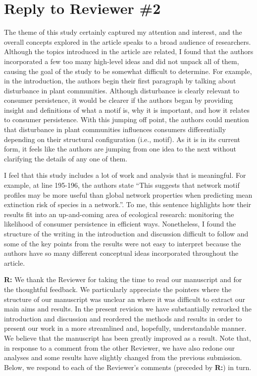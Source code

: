 \documentclass[12pt]{article}
\newenvironment{refquote}{\bigskip \begin{it}}{\end{it}\medskip}
\begin{document}
\clearpage

\section*{Reply to Reviewer \#2}

    \begin{refquote}

        The theme of this study certainly captured my attention and interest, and the overall concepts explored in the article speaks to a broad audience of researchers. Although the topics introduced in the article are related, I found that the authors incorporated a few too many high-level ideas
        and did not unpack all of them, causing the goal of the study to be somewhat difficult to determine. For example, in the introduction, the authors begin their first paragraph by talking about disturbance in plant communities. Although disturbance is clearly relevant to consumer persistence, it would be clearer if the authors began by providing insight and definitions of what a motif is, why it is important, and how it relates to consumer persistence. With this jumping off point, the authors could mention that disturbance in plant communities influences consumers differentially depending on their structural configuration (i.e., motif). As it is in its current form, it feels like the authors are jumping from one idea to the next without clarifying the details of any one of them.

        I feel that this study includes a lot of work and analysis that is meaningful. For example, at line 195-196, the authors state ``This suggests that network motif profiles may be more useful than global network properties when predicting mean extinction risk of species in a network.''. To me, this sentence highlights how their results fit into an up-and-coming area of ecological research: monitoring the likelihood of consumer persistence in efficient ways. Nonetheless, I found the structure of the writing in the introduction and discussion difficult to follow and some of the key points from the results were not easy to interpret because the authors have so many different conceptual ideas incorporated throughout the article.

    \end{refquote}


    \textbf{R:} We thank the Reviewer for taking the time to read our manuscript and for the thoughtful feedback. We particularly appreciate the pointers where the structure of our manuscript was unclear an where it was difficult to extract our main aims and results. In the present revision we have substantially reworked the introduction and discussion and reordered the methods and results in order to present our work in a more streamlined and, hopefully, understandable manner. We believe that the manuscript has been greatly improved as a result. Note that, in response to a comment from the other Reviewer, we have also redone our analyses and some results have slightly changed from the previous submission. Below, we respond to each of the Reviewer's comments (preceded by \textbf{R:}) in turn.
\end{document}
